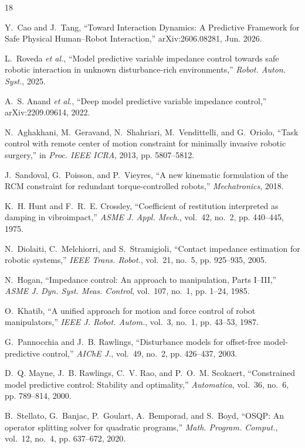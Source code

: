 \begin{thebibliography}{18}

Y.~Cao and J.~Tang, ``Toward Interaction Dynamics: A Predictive Framework for Safe Physical Human--Robot Interaction,'' arXiv:2606.08281, Jun. 2026.

L.~Roveda \emph{et al.}, ``Model predictive variable impedance control towards safe robotic interaction in unknown disturbance-rich environments,'' \emph{Robot. Auton. Syst.}, 2025.

A.~S. Anand \emph{et al.}, ``Deep model predictive variable impedance control,'' arXiv:2209.09614, 2022.

N.~Aghakhani, M.~Geravand, N.~Shahriari, M.~Vendittelli, and G.~Oriolo, ``Task control with remote center of motion constraint for minimally invasive robotic surgery,'' in \emph{Proc. IEEE ICRA}, 2013, pp. 5807--5812.

J.~Sandoval, G.~Poisson, and P.~Vieyres, ``A new kinematic formulation of the RCM constraint for redundant torque-controlled robots,'' \emph{Mechatronics}, 2018.

K.~H. Hunt and F.~R.~E. Crossley, ``Coefficient of restitution interpreted as damping in vibroimpact,'' \emph{ASME J. Appl. Mech.}, vol.~42, no.~2, pp. 440--445, 1975.

N.~Diolaiti, C.~Melchiorri, and S.~Stramigioli, ``Contact impedance estimation for robotic systems,'' \emph{IEEE Trans. Robot.}, vol.~21, no.~5, pp. 925--935, 2005.

N.~Hogan, ``Impedance control: An approach to manipulation, Parts I--III,'' \emph{ASME J. Dyn. Syst. Meas. Control}, vol.~107, no.~1, pp. 1--24, 1985.

O.~Khatib, ``A unified approach for motion and force control of robot manipulators,'' \emph{IEEE J. Robot. Autom.}, vol.~3, no.~1, pp. 43--53, 1987.

G.~Pannocchia and J.~B. Rawlings, ``Disturbance models for offset-free model-predictive control,'' \emph{AIChE J.}, vol.~49, no.~2, pp. 426--437, 2003.

D.~Q. Mayne, J.~B. Rawlings, C.~V. Rao, and P.~O.~M. Scokaert, ``Constrained model predictive control: Stability and optimality,'' \emph{Automatica}, vol.~36, no.~6, pp. 789--814, 2000.

B.~Stellato, G.~Banjac, P.~Goulart, A.~Bemporad, and S.~Boyd, ``OSQP: An operator splitting solver for quadratic programs,'' \emph{Math. Program. Comput.}, vol.~12, no.~4, pp. 637--672, 2020.

\end{thebibliography}
